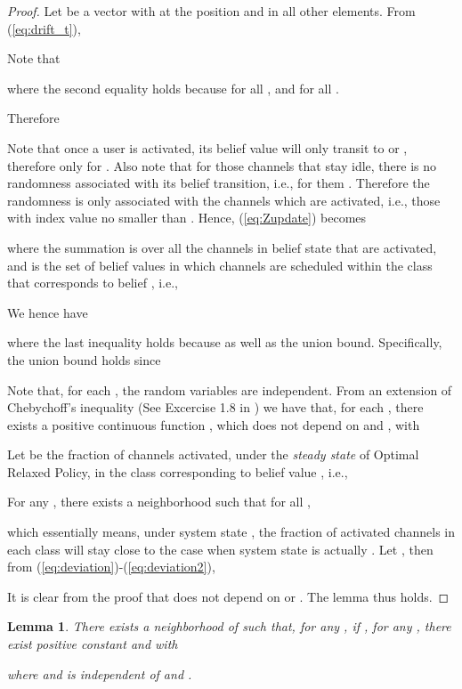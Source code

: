 \documentclass[11pt,twocolumn]{IEEEtran}
\newtheorem{lemma}{Lemma}
\begin{document}
\begin{proof}
Let  be a vector with  at the  position and  in all other elements. From (\ref{eq:drift_t}),


Note that

where the second equality holds because  for all , and  for all .

Therefore


Note that once a user is activated, its belief value will only transit to  or , therefore  only for . Also note that for those channels that stay idle, there is no randomness associated with its belief transition, i.e., for them . Therefore the randomness is only associated with the channels which are activated, i.e., those with index value no smaller than . Hence, (\ref{eq:Zupdate}) becomes

where the summation  is over all the channels in belief state  that are activated, and  is the set of belief values in which channels are scheduled within the class that corresponds to belief , i.e.,


We hence have

where the last inequality holds because  as well as the union bound. Specifically, the union bound holds since


Note that, for each , the random variables  are independent. From an extension of Chebychoff's inequality (See Excercise 1.8 in \cite{Weiss_LD}) we have that, for each , there exists a positive continuous function , which does not depend on  and , with


Let  be the fraction of channels activated, under the \emph{steady state} of Optimal Relaxed Policy, in the class corresponding to belief value , i.e.,


For any , there exists a neighborhood  such that for all ,

which essentially means, under system state , the fraction of activated channels in each class will stay close to the case when system state is actually . Let , then from (\ref{eq:deviation})-(\ref{eq:deviation2}),


It is clear from the proof that  does not depend on  or . The lemma thus holds.
\end{proof}
\vspace{5pt}

\begin{lemma}
\label{lemma:onestep2}
There exists a neighborhood  of  such that, for any , if , for any , there exist positive constant  and  with

where  and  is independent of  and .
\end{lemma}
\end{document}
